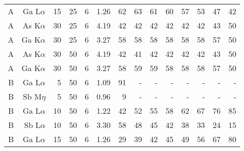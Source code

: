\begin{table}[phtb]
\begin{center}
\begin{tabular}{rrrrrrrrrrrrrr}
            A            & Ga L$\alpha$  & 15             & 25             & 6           & 1.26              & 62             & 63           & 61            & 60             & 57             & 53             & 47            & 42             \\
            A            & As K$\alpha$  & 30             & 25             & 6           & 4.19              & 42             & 42           & 42            & 42             & 42             & 42             & 43            & 50             \\
            A            & Ga K$\alpha$  & 30             & 25             & 6           & 3.27              & 58             & 58           & 58            & 58             & 58             & 58             & 57            & 50             \\
            A            & As K$\alpha$  & 30             & 50             & 6           & 4.19              & 42             & 41           & 42            & 42             & 42             & 42             & 43            & 50             \\
            A            & Ga K$\alpha$  & 30             & 50             & 6           & 3.27              & 58             & 59           & 59            & 58             & 58             & 58             & 57            & 50             \\
            \hline
            B            & Ga L$\alpha$  & 5              & 50             & 6           & 1.09              & 91             & -            & -             & -              & -              & -              & -             & -              \\
            B            & Sb M$\eta$    & 5              & 50             & 6           & 0.96              & 9              & -            & -             & -              & -              & -              & -             & -              \\
            B            & Ga L$\alpha$  & 10             & 50             & 6           & 1.22              & 42             & 52           & 55            & 58             & 62             & 67             & 76            & 85             \\
            B            & Sb L$\alpha$  & 10             & 50             & 6           & 3.30              & 58             & 48           & 45            & 42             & 38             & 33             & 24            & 15             \\
            B            & Ga L$\alpha$  & 15             & 50             & 6           & 1.26              & 29             & 39           & 42            & 45             & 49             & 56             & 67            & 80             \\

\end{tabular}
\end{center}
\end{table}
